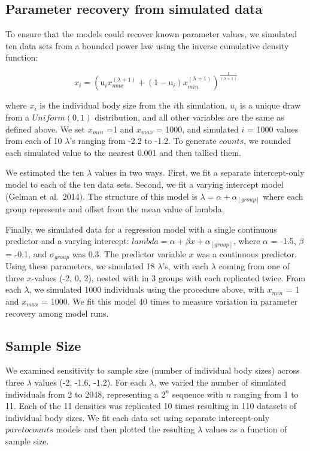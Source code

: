 \documentclass[
  12pt,
]{article}
\numberwithin{equation}
\begin{document}
\hypertarget{parameter-recovery-from-simulated-data}{%
\subsection{Parameter recovery from simulated
data}\label{parameter-recovery-from-simulated-data}}

To ensure that the models could recover known parameter values, we
simulated ten data sets from a bounded power law using the inverse
cumulative density function:

\[
x_i = (\text{u}_ix_{max}^{(\lambda+1)} +  (1-\text{u}_i)  x_{min}^{(\lambda+1)} ) ^ {\frac{1}{(\lambda+1)}}
\]

where \(x_i\) is the individual body size from the \(i\)th simulation,
\(u_i\) is a unique draw from a \(Uniform(0,1)\) distribution, and all
other variables are the same as defined above. We set \(x_{min}\) =1 and
\(x_{max}\) = 1000, and simulated \(i\) = 1000 values from each of 10
\(\lambda\)'s ranging from -2.2 to -1.2. To generate \(counts\), we
rounded each simulated value to the nearest 0.001 and then tallied them.

We estimated the ten \(\lambda\) values in two ways. First, we fit a
separate intercept-only model to each of the ten data sets. Second, we
fit a varying intercept model (Gelman et al.~2014). The structure of
this model is \(\lambda = \alpha + \alpha_{[group]}\) where each group
represents and offset from the mean value of lambda.

Finally, we simulated data for a regression model with a single
continuous predictor and a varying intercept:
\(lambda = \alpha + \beta x + \alpha_{[group]}\), where \(\alpha\) =
-1.5, \(\beta\) = -0.1, and \(\sigma_{group}\) was 0.3. The predictor
variable \(x\) was a continuous predictor. Using these parameters, we
simulated 18 \(\lambda\)'s, with each \(\lambda\) coming from one of
three \(x\)-values (-2, 0, 2), nested with in 3 groups with each
replicated twice. From each \(\lambda\), we simulated 1000 individuals
using the procedure above, with \(x_{min}\) = 1 and \(x_{max}\) = 1000.
We fit this model 40 times to measure variation in parameter recovery
among model runs.

\hypertarget{sample-size}{%
\subsection{Sample Size}\label{sample-size}}

We examined sensitivity to sample size (number of individual body sizes)
across three \(\lambda\) values (-2, -1.6, -1.2). For each \(\lambda\),
we varied the number of simulated individuals from 2 to 2048,
representing a \(2^n\) sequence with \(n\) ranging from 1 to 11. Each of
the 11 densities was replicated 10 times resulting in 110 datasets of
individual body sizes. We fit each data set using separate
intercept-only \(paretocounts\) models and then plotted the resulting
\(\lambda\) values as a function of sample size.
\end{document}
